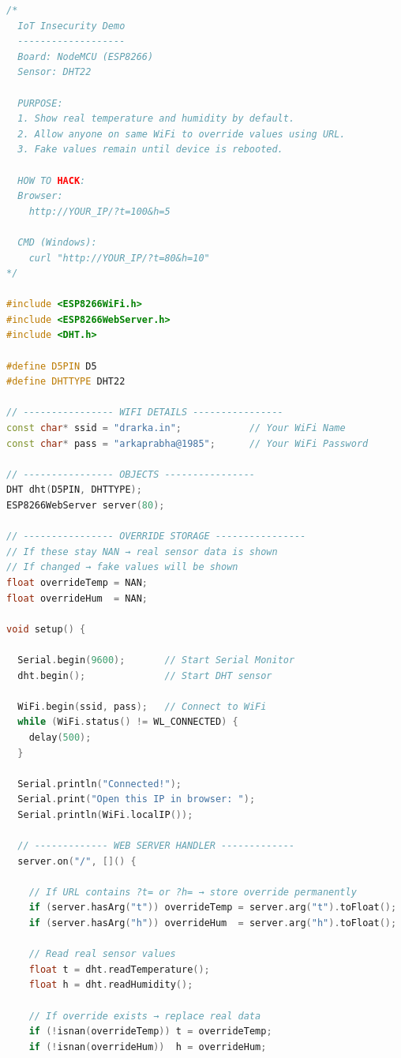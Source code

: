 \begin{lstlisting}[language=C++, caption=23022026\_Level\_6\_IoT\_Insecurity\_Demo\_With\_Description.ino]
/*
  IoT Insecurity Demo
  -------------------
  Board: NodeMCU (ESP8266)
  Sensor: DHT22
  
  PURPOSE:
  1. Show real temperature and humidity by default.
  2. Allow anyone on same WiFi to override values using URL.
  3. Fake values remain until device is rebooted.
  
  HOW TO HACK:
  Browser:
    http://YOUR_IP/?t=100&h=5
  
  CMD (Windows):
    curl "http://YOUR_IP/?t=80&h=10"
*/

#include <ESP8266WiFi.h>
#include <ESP8266WebServer.h>
#include <DHT.h>

#define D5PIN D5
#define DHTTYPE DHT22

// ---------------- WIFI DETAILS ----------------
const char* ssid = "drarka.in";            // Your WiFi Name
const char* pass = "arkaprabha@1985";      // Your WiFi Password

// ---------------- OBJECTS ----------------
DHT dht(D5PIN, DHTTYPE);
ESP8266WebServer server(80);

// ---------------- OVERRIDE STORAGE ----------------
// If these stay NAN → real sensor data is shown
// If changed → fake values will be shown
float overrideTemp = NAN;
float overrideHum  = NAN;

void setup() {

  Serial.begin(9600);       // Start Serial Monitor
  dht.begin();              // Start DHT sensor

  WiFi.begin(ssid, pass);   // Connect to WiFi
  while (WiFi.status() != WL_CONNECTED) {
    delay(500);
  }

  Serial.println("Connected!");
  Serial.print("Open this IP in browser: ");
  Serial.println(WiFi.localIP());

  // ------------- WEB SERVER HANDLER -------------
  server.on("/", []() {

    // If URL contains ?t= or ?h= → store override permanently
    if (server.hasArg("t")) overrideTemp = server.arg("t").toFloat();
    if (server.hasArg("h")) overrideHum  = server.arg("h").toFloat();

    // Read real sensor values
    float t = dht.readTemperature();
    float h = dht.readHumidity();

    // If override exists → replace real data
    if (!isnan(overrideTemp)) t = overrideTemp;
    if (!isnan(overrideHum))  h = overrideHum;


\end{lstlisting}

